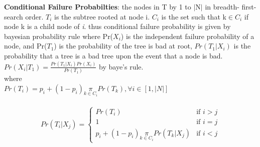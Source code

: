 \documentclass[10pt]{sigplan-proc-varsize}
\begin{document}
{\bf Conditional Failure Probabilties}: the nodes in T by 1 to $|$N$|$ in breadth- first-search order. $T_i$ is the subtree rooted at node i. $C_i$ is the set such that k$\in$$C_i$ if node k is a   child node of {\it i}. thus conditional failure probability is given by bayesian probability rule where Pr($X_i$) is the independent failure probability of a node, and Pr($T_1$) is the probability of the tree is bad at root, $Pr(T_1|X_i)$ is the probability that a tree is a bad tree upon the event that a node is bad. \\
$Pr(X_i|T_1) = \frac{Pr(T_1|X_i)Pr(X_i)}{Pr(T_1)}$ by baye's rule.\\
where\\
$Pr(T_i) = p_i+(1-p_i) \underset{k{\in}C_i}{\pi}Pr(T_k) , \forall i \in [1,|N|]$\\
\\

\[
 Pr(T_i|X_j) =
  \begin{cases}
   Pr(T_i) & \text{if } i > j \\
   1       & \text{if } i=j \\
   p_i+(1-p_i)  \underset{k{\in}C_i}{\pi} Pr(T_k|X_j)  & \text{if } i<j
  \end{cases}
\]

\appendix
%
%


\end{document}

